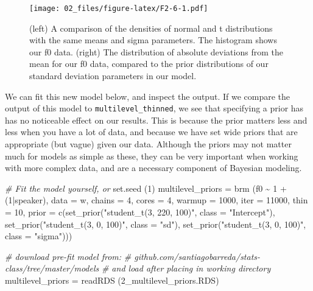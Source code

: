 \documentclass[
]{book}
\newenvironment{Shaded}{\begin{snugshade}}{\end{snugshade}}
\newcommand{\AttributeTok}[1]{\textcolor[rgb]{0.77,0.63,0.00}{#1}}
\newcommand{\CommentTok}[1]{\textcolor[rgb]{0.56,0.35,0.01}{\textit{#1}}}
\newcommand{\DecValTok}[1]{\textcolor[rgb]{0.00,0.00,0.81}{#1}}
\newcommand{\FunctionTok}[1]{\textcolor[rgb]{0.00,0.00,0.00}{#1}}
\newcommand{\NormalTok}[1]{#1}
\newcommand{\OtherTok}[1]{\textcolor[rgb]{0.56,0.35,0.01}{#1}}
\newcommand{\SpecialCharTok}[1]{\textcolor[rgb]{0.00,0.00,0.00}{#1}}
\newcommand{\StringTok}[1]{\textcolor[rgb]{0.31,0.60,0.02}{#1}}
\begin{document}
\begin{figure}
\centering
\texttt{[image: 02\_files/figure-latex/F2-6-1.pdf]}
\caption{\label{fig:F2-6}(left) A comparison of the densities of normal and t distributions with the same means and sigma parameters. The histogram shows our f0 data. (right) The distribution of absolute deviations from the mean for our f0 data, compared to the prior distributions of our standard deviation parameters in our model.}
\end{figure}

We can fit this new model below, and inspect the output. If we compare the output of this model to \texttt{multilevel\_thinned}, we see that specifying a prior has has no noticeable effect on our results. This is because the prior matters less and less when you have a lot of data, and because we have set wide priors that are appropriate (but vague) given our data. Although the priors may not matter much for models as simple as these, they can be very important when working with more complex data, and are a necessary component of Bayesian modeling.

\begin{Shaded}
\begin{Highlighting}[]
\CommentTok{\# Fit the model yourself, or}
\FunctionTok{set.seed}\NormalTok{ (}\DecValTok{1}\NormalTok{)}
\NormalTok{multilevel\_priors }\OtherTok{=}  
  \FunctionTok{brm}\NormalTok{ (f0 }\SpecialCharTok{\textasciitilde{}} \DecValTok{1} \SpecialCharTok{+}\NormalTok{ (}\DecValTok{1}\SpecialCharTok{|}\NormalTok{speaker), }\AttributeTok{data =}\NormalTok{ w, }\AttributeTok{chains =} \DecValTok{4}\NormalTok{, }\AttributeTok{cores =} \DecValTok{4}\NormalTok{,}
       \AttributeTok{warmup =} \DecValTok{1000}\NormalTok{, }\AttributeTok{iter =} \DecValTok{11000}\NormalTok{, }\AttributeTok{thin =} \DecValTok{10}\NormalTok{,}
       \AttributeTok{prior =} \FunctionTok{c}\NormalTok{(}\FunctionTok{set\_prior}\NormalTok{(}\StringTok{"student\_t(3, 220, 100)"}\NormalTok{, }\AttributeTok{class =} \StringTok{"Intercept"}\NormalTok{),}
                 \FunctionTok{set\_prior}\NormalTok{(}\StringTok{"student\_t(3, 0, 100)"}\NormalTok{, }\AttributeTok{class =} \StringTok{"sd"}\NormalTok{),}
                 \FunctionTok{set\_prior}\NormalTok{(}\StringTok{"student\_t(3, 0, 100)"}\NormalTok{, }\AttributeTok{class =} \StringTok{"sigma"}\NormalTok{)))}

\CommentTok{\# download pre{-}fit model from: }
\CommentTok{\# github.com/santiagobarreda/stats{-}class/tree/master/models}
\CommentTok{\# and load after placing in working directory}
\NormalTok{multilevel\_priors }\OtherTok{=} \FunctionTok{readRDS}\NormalTok{ (}\StringTok{\textquotesingle{}2\_multilevel\_priors.RDS\textquotesingle{}}\NormalTok{)}
\end{Highlighting}
\end{Shaded}
\end{document}
